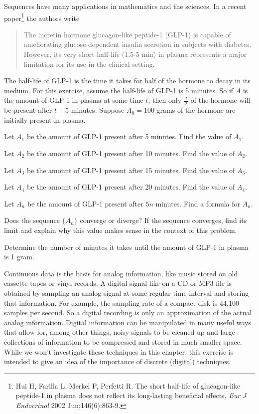 \begin{exercises}
\item Sequences have many applications in mathematics and the sciences. In a recent paper\footnote{Hui H, Farilla L, Merkel P, Perfetti R. The short half-life of glucagon-like peptide-1 in plasma does not reflect its long-lasting beneficial effects, \emph{Eur J Endocrinol} 2002 Jun;146(6):863-9.} the authors write
     \begin{quote}
     The incretin hormone glucagon-like peptide-1 (GLP-1) is capable of ameliorating glucose-dependent insulin secretion in subjects with diabetes. However, its very short half-life (1.5-5 min) in plasma represents a major limitation for its use in the clinical setting.
      \end{quote}
      The half-life of GLP-1 is the time it takes for half of the hormone to decay in its medium. For this exercise, assume the half-life of GLP-1 is 5 minutes. So if $A$ is the amount of GLP-1 in plasma at some time $t$, then only $\frac{A}{2}$ of the hormone will be present after $t+5$ minutes. Suppose $A_0 = 100$ grams of the hormone are initially present in plasma.
    \ba
    \item Let $A_1$ be the amount of GLP-1 present after 5 minutes. Find the value of $A_1$.
    \item Let $A_2$ be the amount of GLP-1 present after 10 minutes. Find the value of $A_2$.
    \item Let $A_3$ be the amount of GLP-1 present after 15 minutes. Find the value of $A_3$.
    \item Let $A_4$ be the amount of GLP-1 present after 20 minutes. Find the value of $A_4$.
    \item Let $A_n$ be the amount of GLP-1 present after $5n$ minutes. Find a formula for $A_n$.
    \item Does the sequence $\{A_n\}$ converge or diverge? If the sequence converges, find its limit and explain why this value makes sense in the context of this problem.
    \item Determine the number of minutes it takes until the amount of GLP-1 in plasma is 1 gram.
    \ea
    
    \item Continuous data is the basis for analog information, like music stored on old cassette tapes or vinyl records. A digital signal like on a CD or MP3 file is obtained by sampling an analog signal at some regular time interval and storing that information. For example, the sampling rate of a compact disk is 44,100 samples per second. So a digital recording is only an approximation of the actual analog information. Digital information can be manipulated in many useful ways that allow for, among other things, noisy signals to be cleaned up and large collections of information to be compressed and stored in much smaller space. While we won't investigate these techniques in this chapter, this exercise is intended to give an idea of the importance of discrete (digital) techniques.


\end{exercises}
